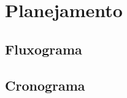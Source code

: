 \chapter{Planejamento}
\label{cap-planejamento}


\section{Fluxograma}
\label{cap-fluxograma}



\section{Cronograma}
\label{cap-cronograma}




